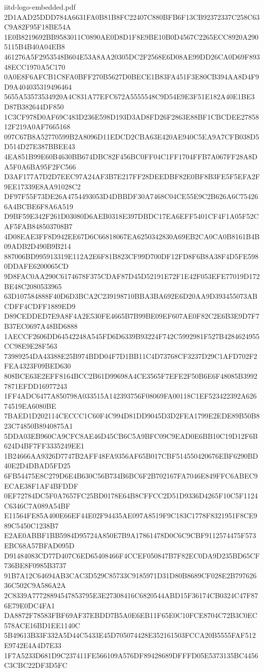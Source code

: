 \begin{filecontents*}[overwrite]{iitd-logo-embedded.pdf}
2D1AAD25DDD784A6631FA0B81B8FC22407C880BFB6F13CB92372337C258C63C9A82F95F18BE54A
1E0B8219692BB9583011C0890AE0D8D1F8E9BE10B0D4567C2265ECC8920A2905115B4B40A04EB8
461276A5F2953548B604E53A8AA20305DC2F2568E6D08AE99DD26CA0D69F89348ECC1970A5C170
0A0E8F6AFCB1C8FA0BFF270B5627D0BECE1B83FA451F3E80CB394AA8D4F9D9A404035319496464
5655A53573534920A4C831A77EFC672A5555548C9D54E9E3F51E182A40E1BE3D87B382644DF850
1C3CF978D0AF69C483D236E598D193D3AD8FD26F2863E88BF1CBCDEE2785812F219A0AF7665168
097C67B8A52770599B2A8096D11EDCD2CBA63E420AE940C5EA9A7CFB038D5D514D27E387BBEE43
4EA851B99E60B4630BB674DBC82F456BC0FF04C1FF1704FFB7A067FF28A8DA5F0A6BA95F2FC566
D3AF177A7D2D7EEC97A24AF3B7E217FF28DEEDBF82E0BF8B3FE5F5EFA2F9EE17339E8AA91028C2
DF97F55F73DE26A4754493053D4DBBDF30A7468C04CE55E9C2B626A6C754266A4BCBE6F8A6A519
D9BF59E342F261D03080D6AEB0318E397DBDC17EA6EFF5401CF4F1A05F52CAF5FAB848503708B7
4D08EAE3FF8D942EE67D6C66818067EA6250342830A69EB2CA0CA0B8161B4B09ADB2D490B9B214
887006BD995913319E112A2E6F81B823CF99D700DF12FD8F6B8A38F4D5FE5980DDAFE6200065CD
9D8FAC0AA290C6174678F375CDAF87D45D52191E72F1E42F053EFE77019D172BE48C2080533965
63D107584888F40D6D3BCA2C239198710BBA3BA692E6D20AA9D393455073ABCDFF4CDFF1889ED9
D89CEDDED7E9A8F4A2E530FE4665B7B99BE09EF607AE0F82C2E6B3E9D7F7B37EC0697A48BD6888
1AECCF2606DD64542248A545FD6D6339B93224F742C5992981F527B4284624955CC98E9E28F563
73989254DA43388E25B974BDD04F7D1BB11C4D73768CF3237D29C1AFD702F2FEA4323F09BED630
808BCE63E2EFF8164BCC2B61D99698A4CE3565F7EFE2F50B6E6F48085B39927871EFDD16977243
1FF4ADC6477A850798A033515A142393756F08069FA00118C1EF523422392A62674519EA6080BE
7BAED1D202114CECCC1C60F4C994D81DD9045D3D2FEA1799E2EDE89B50B823C74850B8940875A1
5DDA03EB960CA9CFC8AE46D45CB6C5A9BFC09C9EAD0E6BB10C19D12F6B624D4BF7FF3335249EE1
1B24666AA9326D7747B2AFF48FA9356AF65B017CBF514550420676EBF6290BD40E2D4DBAD5FD25
6FB54475E8C279D6E4B630C56B734B6BC6F2B702167FA7046E849FFC6ABEC9ECAE38F1AF4BFDDF
0EF72784DC5F0A7657FC25BD0178E64B8CFFCC2D51D9336D4265F10C5F1124C6346C7A089A54BF
E11564FE85A400E66EF44E02F94435AE097A8519F9C183C1778F8321951F8CE989C5450C1238B7
E2AE0ABBF1BB5984D95724A850E7B9A17861478D0C6C9CBF9112574475F573EBC68A57BFAD095D
D91484083CD77D407C6ED65408466F4CCEF050847B7F82EC0DA9D235BD65CF736BE8F0985B3737
91B7A12C64694AB3CAC3D529C85733C9185971D31D80B8689CF028E2B79762636C502C9A586A2A
2C8339A77728894547853795E3E27308416C6820544ABD15F36174CB0324C47F876E79E0DC4FA1
DA8872F78583FBF69AF37EBDD7B5A0E6EB11F65E0C10FCE8704C72B3C0EC578ACE16BD1EE1140C
5B49613B33F332A5D44C5433E45D705074428E352161503FCCA20B5555FAF512E9742E4A4D7E33
1F7A5233D681D9C237411FE566109A576DF89428689DFFFD05E5373135BC4456C3CBC22DF3D5FC

\end{filecontents*}
